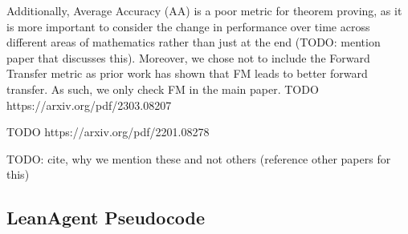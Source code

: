 \documentclass{article} %
\begin{document}
Additionally, Average Accuracy (AA) is a poor metric for theorem proving, as it is more important to consider the change in performance over time across different areas of mathematics rather than just at the end (TODO: mention paper that discusses this). Moreover, we chose not to include the Forward Transfer metric as prior work has shown that FM leads to better forward transfer. As such, we only check FM in the main paper. TODO https://arxiv.org/pdf/2303.08207 

TODO https://arxiv.org/pdf/2201.08278 

TODO: cite, why we mention these and not others (reference other papers for this)


\subsection{LeanAgent Pseudocode}
\end{document}
